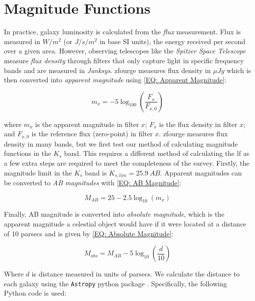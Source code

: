\section{Magnitude Functions} \label{Sec: Magnitude Functions}

In practice, galaxy luminosity is calculated from the \textit{flux} measurement. Flux is measured in $W/m^2$ (or $J/s/m^2$ in base SI units), the energy received per second over a given area. However, observing telescopes like the \textit{Spitzer Space Telescope} measure \textit{flux density} through filters that only capture light in specific frequency bands and are measured in \textit{Janksys}. \gls{zfourge} measures flux density in $\mu Jy$ which is then converted into \textit{apparent magnitude} using \cref{EQ: Apparent Magnitude}: 

\begin{equation}
    m_{x} = -5 \log_{100} \left(\frac{F_{x}}{F_{x,0}}\right)
    \label{EQ: Apparent Magnitude}
\end{equation}

where $m_x$ is the apparent magnitude in filter $x$; $F_x$ is the flux density in filter $x$; and $F_{x,0}$ is the reference flux (zero-point) in filter $x$. \gls{zfourge} measures flux density in many bands, but we first test our method of calculating magnitude functions in the $K_{s}$ band. This requires a different method of calculating the \gls{lf} as a few extra steps are required to meet the completeness of the survey. Firstly, the magnitude limit in the $K_{s}$ band is $K_{s,lim} = 25.9\ AB$. Apparent magnitudes can be converted to \textit{AB magnitudes} with \cref{EQ: AB Magnitude}:

\begin{equation}
    M_{AB} = 25 - 2.5 \log_{10}(m_x)
    \label{EQ: AB Magnitude}
\end{equation}

Finally, AB magnitude is converted into \textit{absolute magnitude}, which is the apparent magnitude a celestial object would have if it were located at a distance of 10 parsecs and is given by \cref{EQ: Absolute Magnitude}:

\begin{equation}
    M_{abs} = M_{AB} - 5 \log_{10} \left(\frac{d}{10}\right)
    \label{EQ: Absolute Magnitude}
\end{equation}

Where $d$ is distance measured in units of parsecs. We calculate the distance to each galaxy using the \texttt{Astropy} python package \citep{astropy_collaboration_astropy_2022}. Specifically, the following Python code is used:

